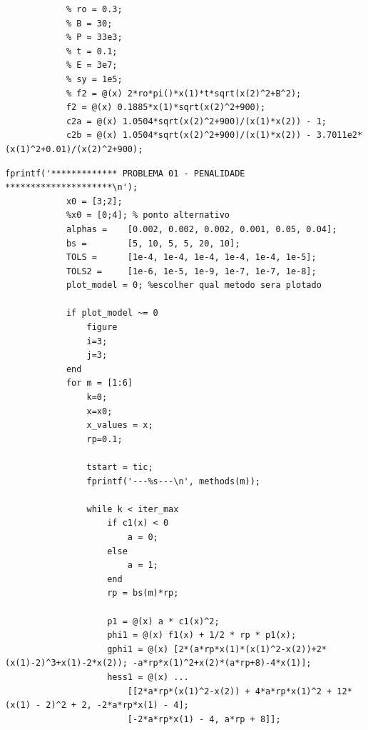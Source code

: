 \documentclass[10pt, a4paper]{article}
\begin{document}
\begin{minipage}{\linewidth}
      \begin{lstlisting}[style=myStyle, caption= defini\c c\~ao das fun\c c\~oes e restri\c c\~oes do problema 02, label=list_prob02]
            % dados do item 02
            % ro = 0.3;
            % B = 30;
            % P = 33e3;
            % t = 0.1;
            % E = 3e7;
            % sy = 1e5;
            % f2 = @(x) 2*ro*pi()*x(1)*t*sqrt(x(2)^2+B^2);
            f2 = @(x) 0.1885*x(1)*sqrt(x(2)^2+900);
            c2a = @(x) 1.0504*sqrt(x(2)^2+900)/(x(1)*x(2)) - 1;
            c2b = @(x) 1.0504*sqrt(x(2)^2+900)/(x(1)*x(2)) - 3.7011e2*(x(1)^2+0.01)/(x(2)^2+900);
      \end{lstlisting}
\end{minipage}

\begin{minipage}{\linewidth}
      \begin{lstlisting}[style=myStyle, caption= trecho de c\'odigo do problema 01 (penalidade), label=list_p01_pen]
            fprintf('************* PROBLEMA 01 - PENALIDADE *********************\n');
            x0 = [3;2];
            %x0 = [0;4]; % ponto alternativo
            alphas =    [0.002, 0.002, 0.002, 0.001, 0.05, 0.04];
            bs =        [5, 10, 5, 5, 20, 10];
            TOLS =      [1e-4, 1e-4, 1e-4, 1e-4, 1e-4, 1e-5];
            TOLS2 =     [1e-6, 1e-5, 1e-9, 1e-7, 1e-7, 1e-8];
            plot_model = 0; %escolher qual metodo sera plotado

            if plot_model ~= 0
                figure
                i=3;
                j=3;
            end
            for m = [1:6]
                k=0;
                x=x0;
                x_values = x;
                rp=0.1;

                tstart = tic;
                fprintf('---%s---\n', methods(m));

                while k < iter_max
                    if c1(x) < 0
                        a = 0;
                    else
                        a = 1;
                    end
                    rp = bs(m)*rp;

                    p1 = @(x) a * c1(x)^2;
                    phi1 = @(x) f1(x) + 1/2 * rp * p1(x);
                    gphi1 = @(x) [2*(a*rp*x(1)*(x(1)^2-x(2))+2*(x(1)-2)^3+x(1)-2*x(2)); -a*rp*x(1)^2+x(2)*(a*rp+8)-4*x(1)];
                    hess1 = @(x) ...
                        [[2*a*rp*(x(1)^2-x(2)) + 4*a*rp*x(1)^2 + 12*(x(1) - 2)^2 + 2, -2*a*rp*x(1) - 4];
                        [-2*a*rp*x(1) - 4, a*rp + 8]];


\end{lstlisting}
\end{minipage}
\end{document}
